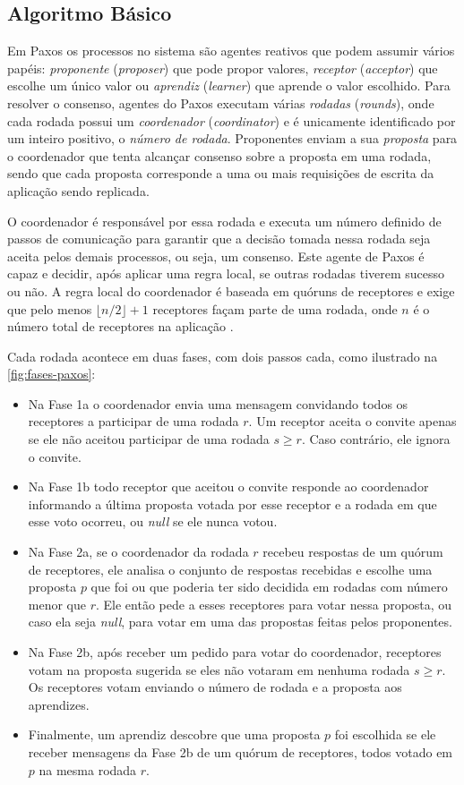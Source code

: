 \subsection{Algoritmo Básico}

Em Paxos os processos no sistema são agentes reativos que podem assumir vários
papéis: \emph{proponente} (\emph{proposer}) que pode propor valores, \emph{receptor}
(\emph{acceptor}) que escolhe um único valor ou \emph{aprendiz} (\emph{learner}) que
aprende o valor escolhido. Para resolver o consenso, agentes do Paxos executam várias
\emph{rodadas} (\emph{rounds}), onde cada rodada possui um \emph{coordenador}
(\emph{coordinator}) e é unicamente identificado por um inteiro positivo, o \emph{número
de rodada}. Proponentes enviam a sua \emph{proposta} para o coordenador que tenta alcançar
consenso sobre a proposta em uma rodada, sendo que cada proposta corresponde a uma ou mais
requisições de escrita da aplicação sendo replicada.

O coordenador é responsável por essa rodada e executa um número definido de passos de
comunicação para garantir que a decisão tomada nessa rodada seja aceita pelos demais
processos, ou seja, um consenso. Este agente de Paxos é capaz e decidir, após aplicar uma
regra local, se outras rodadas tiverem sucesso ou não. A regra local do coordenador é
baseada em quóruns de receptores e exige que pelo menos $\lfloor n/2 \rfloor + 1$
receptores façam parte de uma rodada, onde $n$ é o número total de receptores na
aplicação \cite{lamport98}.

Cada rodada acontece em duas fases, com dois passos cada, como ilustrado na
\autoref{fig:fases-paxos}:

\begin{itemize}
  \item Na Fase 1a o coordenador envia uma mensagem convidando todos os receptores a
    participar de uma rodada $r$. Um receptor aceita o convite apenas se ele não aceitou
    participar de uma rodada $s \geq r$. Caso contrário, ele ignora o convite.
  \item Na Fase 1b todo receptor que aceitou o convite responde ao coordenador informando
    a última proposta votada por esse receptor e a rodada em que esse voto ocorreu, ou
    \textsl{null} se ele nunca votou.
  \item Na Fase 2a, se o coordenador da rodada $r$ recebeu respostas de um quórum de
    receptores, ele analisa o conjunto de respostas recebidas e escolhe uma proposta $p$
    que foi ou que poderia ter sido decidida em rodadas com número menor que $r$. Ele
    então pede a esses receptores para votar nessa proposta, ou caso ela seja
    \textsl{null}, para votar em uma das propostas feitas pelos proponentes.
  \item Na Fase 2b, após receber um pedido para votar do coordenador, receptores votam na
    proposta sugerida se eles não votaram em nenhuma rodada $s \geq r$. Os receptores
    votam enviando o número de rodada e a proposta aos aprendizes.
  \item Finalmente, um aprendiz descobre que uma proposta $p$ foi escolhida se ele receber
    mensagens da Fase 2b de um quórum de receptores, todos votado em $p$ na mesma rodada
    $r$.
\end{itemize}

